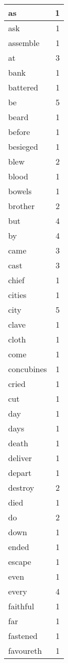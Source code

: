 \begin{center}
\begin{longtable}{l|r}
as & 1 \\ \hline
ask & 1 \\ \hline
assemble & 1 \\ \hline
at & 3 \\ \hline
bank & 1 \\ \hline
battered & 1 \\ \hline
be & 5 \\ \hline
beard & 1 \\ \hline
before & 1 \\ \hline
besieged & 1 \\ \hline
blew & 2 \\ \hline
blood & 1 \\ \hline
bowels & 1 \\ \hline
brother & 2 \\ \hline
but & 4 \\ \hline
by & 4 \\ \hline
came & 3 \\ \hline
cast & 3 \\ \hline
chief & 1 \\ \hline
cities & 1 \\ \hline
city & 5 \\ \hline
clave & 1 \\ \hline
cloth & 1 \\ \hline
come & 1 \\ \hline
concubines & 1 \\ \hline
cried & 1 \\ \hline
cut & 1 \\ \hline
day & 1 \\ \hline
days & 1 \\ \hline
death & 1 \\ \hline
deliver & 1 \\ \hline
depart & 1 \\ \hline
destroy & 2 \\ \hline
died & 1 \\ \hline
do & 2 \\ \hline
down & 1 \\ \hline
ended & 1 \\ \hline
escape & 1 \\ \hline
even & 1 \\ \hline
every & 4 \\ \hline
faithful & 1 \\ \hline
far & 1 \\ \hline
fastened & 1 \\ \hline
favoureth & 1 \\ \hline

\end{longtable}
\end{center}
